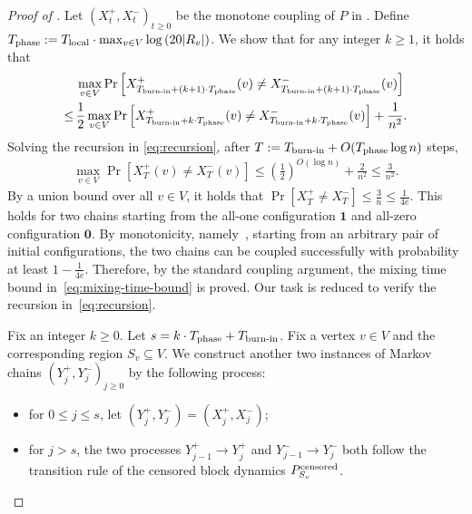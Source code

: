 \documentclass[11pt]{amsart}
\newcommand{\tp}[1]{{\left( #1 \right)}}
\renewcommand{\Pr}{\mathop{\mathrm{Pr}}\nolimits}
\def\*#1{\mathbf{#1}}
\def\+#1{\mathcal{#1}}
\newcommand{\defeq}{:=}
\theoremstyle{definition}
\theoremstyle{remark}
\begin{document}
\begin{proof}[Proof of ]
Let $(X_t^+,X_t^-)_{t \geq 0}$ be the monotone coupling of $P$ in . 
Define $T_{\textnormal{phase}} \defeq T_{\textnormal{local}} \cdot \max_{v \in V} \log \left(20 |R_v|\right)$. We show that for any integer $k \geq 1$, it holds that
\begin{align}\label{eq:recursion}
    &\max_{v \in V} \Pr\left[X^+_{T_{\textnormal{burn-in}} + (k+1) \cdot T_{\textnormal{phase}}}(v) \neq X_{T_{\textnormal{burn-in}} + (k+1) \cdot T_{\textnormal{phase}}}^-(v)\right]\notag\\
    \leq\,& \frac{1}{2} \max_{v \in V} \Pr\left[X^+_{T_{\textnormal{burn-in}} + k \cdot T_{\textnormal{phase}}}(v) \neq X_{T_{\textnormal{burn-in}} + k \cdot T_{\textnormal{phase}}}^-(v)\right] + \frac{1}{n^2}.
\end{align}
Solving the recursion in \eqref{eq:recursion}, after $T \defeq T_{\textnormal{burn-in}} + O(T_{\textnormal{phase}}\log n)$ steps, 
\begin{align*}
\max_{v \in V} \Pr\left[X^+_T(v) \neq X^-_T(v)\right] \leq \tp{\frac{1}{2}}^{O(\log n)} + \frac{2}{n^2} \leq \frac{3}{n^2}. 
\end{align*}
By a union bound over all $v \in V$, it holds that $\Pr[X^+_T \neq X^-_T] \leq \frac{3}{n} \leq \frac{1}{4e}$.
This holds for two chains starting from the all-one configuration $\*1$ and all-zero configuration $\*0$.
By monotonicity, namely~, starting from an arbitrary pair of initial configurations, the two chains can be coupled successfully with probability at least $1-\frac{1}{4e}$. Therefore, by the standard coupling argument, the mixing time bound in~\eqref{eq:mixing-time-bound} is proved. Our task is reduced to verify the recursion in~\eqref{eq:recursion}.


Fix an integer $k \geq 0$. Let $s = k \cdot T_{\textnormal{phase}} + T_{\textnormal{burn-in}}$.
Fix a vertex $v \in V$ and the corresponding region $S_v\subseteq V$.
We construct another two instances of Markov chains $(Y_j^+,Y_j^-)_{j \geq 0}$ by the following process:
\begin{itemize}
    \item for $0 \leq j \leq s$, let $(Y_j^+,Y_j^-) = (X_j^+,X_j^-)$;
    \item for $j > s$, the two processes $Y_{j-1}^+ \to Y_j^+$  and $Y_{j-1}^- \to Y_j^-$ both follow the transition rule of the censored block dynamics $P_{S_v}^{\textnormal{censored}}$.
\end{itemize}


\end{proof}
\end{document}
